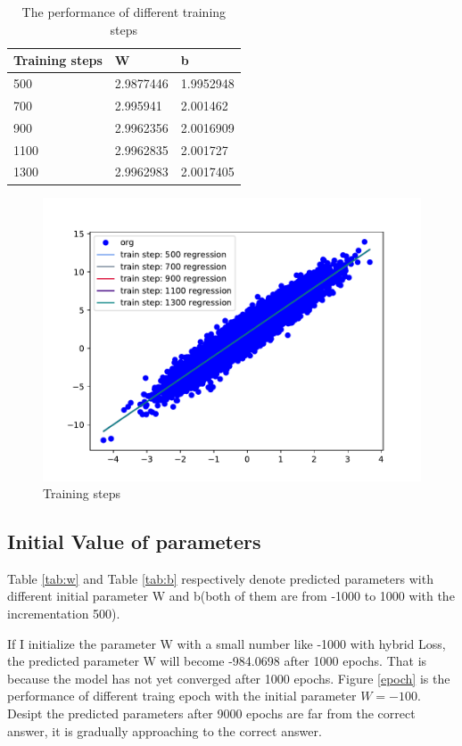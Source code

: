 \documentclass{article}
\begin{document}
\begin{table}
  \caption{The performance of different training steps}
  \label{tab:ts}
  \centering
  \begin{tabular}{lll}
    \toprule
    Training steps     & W     & b \\
    \midrule
    500 & 2.9877446  & 1.9952948     \\
    700     & 2.995941 & 2.001462     \\
    900     & 2.9962356       & 2.0016909  \\
    1100     & 2.9962835 & 2.001727      \\
    1300    & 2.9962983      & 2.0017405  \\
    \bottomrule
  \end{tabular}
\end{table}

\begin{figure}
  \centering
  \includegraphics[scale=0.5]{imgs/ts.pdf}
  \caption{Training steps}
  \label{ts}
\end{figure}

\subsection{Initial Value of parameters}
Table \ref{tab:w} and Table \ref{tab:b} respectively denote predicted parameters with different initial parameter W and b(both of them are from -1000 to 1000 with the incrementation 500).

If I initialize the parameter W with a small number like -1000 with hybrid Loss, the predicted parameter W will become -984.0698 after 1000 epochs. That is because the model has not yet converged after 1000 epochs. Figure \ref{epoch} is the performance of different traing epoch with the initial parameter $W=-100$. Desipt the predicted parameters after 9000 epochs are far from the correct answer, it is gradually approaching to the correct answer.
\end{document}
